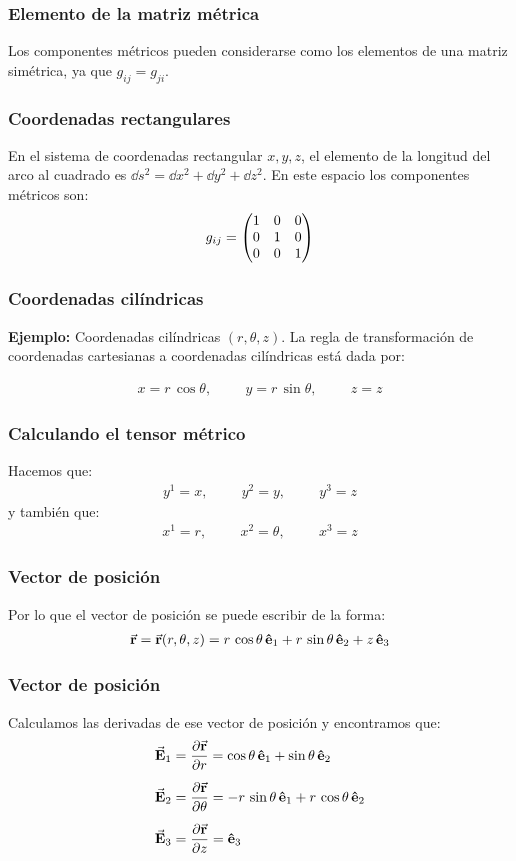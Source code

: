 \documentclass[12pt]{beamer}
\begin{document}
\begin{frame}
\frametitle{Elemento de la matriz métrica}
Los componentes métricos pueden considerarse como los elementos de una matriz simétrica, ya que $g_{ij} = g_{ji}$.
\end{frame}
\begin{frame}
\frametitle{Coordenadas rectangulares}
En el sistema de coordenadas rectangular $x, y, z$, el elemento de la longitud del arco al cuadrado es $\dd{s}^{2} = \dd{x}^{2} + \dd{y}^{2} + \dd{z}^{2}$.
\pause
En este espacio los componentes métricos son:
\begin{align*}
g_{ij} = \mqty(
1 & 0 & 0 \\
0 & 1 & 0 \\
0 & 0 & 1 )
\end{align*}
\end{frame}
\begin{frame}
\frametitle{Coordenadas cilíndricas}
\textbf{Ejemplo: } Coordenadas cilíndricas $(r, \theta, z)$.
La regla de transformación de coordenadas cartesianas a coordenadas cilíndricas está dada por:
\par
\begin{align*}
x = r \, \cos \theta, \hspace{1cm} y = r \, \sin \theta, \hspace{1cm} z = z
\end{align*}
\end{frame}
\begin{frame}
\frametitle{Calculando el tensor métrico}
Hacemos que:
\pause
\begin{align*}
y^{1} = x, \hspace{1cm} y^{2} = y, \hspace{1cm} y^{3} = z
\end{align*}
\pause
y también que:
\begin{align*}
x^{1} = r, \hspace{1cm} x^{2} = \theta, \hspace{1cm} x^{3} = z
\end{align*}
\end{frame}
\begin{frame}
\frametitle{Vector de posición}
Por lo que el vector de posición se puede escribir de la forma:
\pause
\begin{align*}
\va{r} = \va{r} (r, \theta, z) = r \, \cos \theta \, \vu{e}_{1} + r \, \sin \theta \, \vu{e}_{2} + z \, \vu{e}_{3}
\end{align*}
\end{frame}
\begin{frame}
\frametitle{Vector de posición}
Calculamos las derivadas de ese vector de posición y encontramos que:
\pause
\begin{align*}
\va{E}_{1} &= \pdv{\va{r}}{r} = \cos \theta \, \vu{e}_{1} + \sin \theta \, \vu{e}_{2} \\[0.5em]
\va{E}_{2} &= \pdv{\va{r}}{\theta} = -r \, \sin \theta \, \vu{e}_{1} + r \, \cos \theta \, \vu{e}_{2} \\[0.5em]
\va{E}_{3} &= \pdv{\va{r}}{z} = \vu{e}_{3}
\end{align*}
\end{frame}
\end{document}
